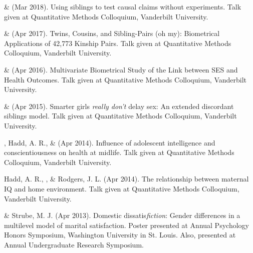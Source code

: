 \item\meb \& \Joe (Mar 2018). Using siblings to test causal claims without experiments. Talk given at Quantitative Methods Colloquium, Vanderbilt University.
%
\item\meb \& \Joe (Apr 2017). Twins, Cousins, and Sibling-Pairs (oh my): Biometrical Applications of 42,773 Kinship Pairs. Talk given at Quantitative Methods Colloquium, Vanderbilt University. %
%
\item\meb \& \Joe (Apr 2016). Multivariate Biometrical Study of the Link between SES and Health Outcomes. Talk given at Quantitative Methods Colloquium, Vanderbilt University.
%
\item\meb \& \Joe (Apr 2015). Smarter girls \textit{really don't} delay sex: An extended discordant siblings model. Talk given at Quantitative Methods Colloquium, Vanderbilt University.
\item\meb, Hadd, A. R., \& \Joe (Apr 2014). Influence of adolescent intelligence and conscientiousness on health at midlife. Talk given at Quantitative Methods Colloquium, Vanderbilt University. 
%
\item Hadd, A. R., \meb, \& Rodgers, J. L. (Apr 2014). The relationship between maternal IQ and home environment. Talk given at Quantitative Methods Colloquium, Vanderbilt University.
%
\item\meb \& Strube, M. J. (Apr 2013). Domestic dissatis{\em fiction}: Gender differences in a multilevel model of marital satisfaction. Poster presented at Annual Psychology Honors Symposium, Washington University in St. Louis. Also, presented at Annual Undergraduate Research Symposium.
%
